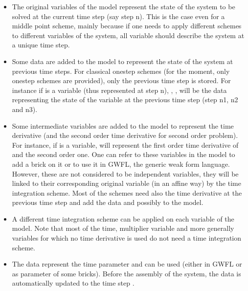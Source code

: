 \documentclass[a4paper,11pt,english]{sphinxmanual}
\begin{document}
\begin{itemize}
\item {} 
The original variables of the model represent the state of the system to be solved at the current time step (say step n). This is the case even for a middle point scheme, mainly because if one needs to apply different schemes to different variables of the system, all variable should describe the system at a unique time step.

\item {} 
Some data are added to the model to represent the state of the system at previous time steps. For classical one\sphinxhyphen{}step schemes (for the moment, only one\sphinxhyphen{}step schemes are provided), only the previous time step is stored. For instance if  is a variable (thus represented at step n), , ,  will be the data representing the state of the variable at the previous time step (step n\sphinxhyphen{}1, n\sphinxhyphen{}2 and n\sphinxhyphen{}3).

\item {} 
Some intermediate variables are added to the model to represent the time derivative (and the second order time derivative for second order problem). For instance, if  is a variable,  will represent the first order time derivative of  and  the second order one. One can refer to these variables in the model to add a brick on it or to use it in GWFL, the generic weak form language. However, these are not considered to be independent variables, they will be linked to their corresponding original variable (in an affine way) by the time integration scheme. Most of the schemes need also the time derivative at the previous time step and add the data  and possibly  to the model.

\item {} 
A different time integration scheme can be applied on each variable of the model. Note that most of the time, multiplier variable and more generally variables for which no time derivative is used do not need a time integration scheme.

\item {} 
The data  represent the time parameter and can be used (either in GWFL or as parameter of some bricks). Before the assembly of the system, the data  is automatically updated to the time step .


\end{itemize}
\end{document}
